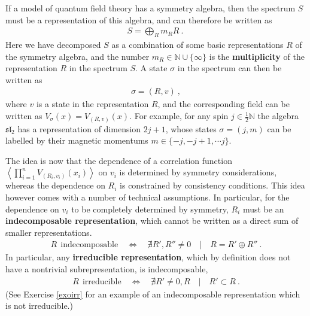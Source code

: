 \documentclass[12pt, a4paper, notitlepage, twoside]{report}
\numberwithin{equation}{section}
\theoremstyle{break}
\begin{document}
If a model of quantum field theory has a symmetry algebra, then the spectrum $S$ must be a representation of this algebra, and can therefore be written as
\begin{align}
 S = \bigoplus_R m_R  R\ .\
\label{somr}
\end{align}
Here we have decomposed $S$ as a combination of some basic representations $R$ of the symmetry algebra, and the number $m_R \in {\mathbb{N}}\cup\{\infty\}$ is the \textbf{\boldmath multiplicity} of the representation $R$ in the spectrum $S$.
A state $\sigma$ in the spectrum can then be written as 
\begin{align}
 \sigma = (R,v)\ ,
\label{arv}
\end{align}
where $v$ is a state in the representation $R$, and the corresponding field can be written as 
$V_\sigma(x)= V_{(R,v)}(x)$. For example, for any spin $j\in \frac12 \mathbb{N}$ the algebra $\mathfrak{sl}_2$ has a representation of dimension $2j+1$, whose states $\sigma = (j,m)$ can be labelled by their magnetic momentums $m\in\{-j, -j+1,\cdots j\}$.

The idea is now that the dependence of a correlation function $\left\langle \prod_{i=1}^n V_{(R_i,v_i)}(x_i)\right\rangle$ on $v_i$ is determined by symmetry considerations, whereas the dependence on $R_i$ is constrained by consistency conditions.
This idea however comes with a number of technical assumptions.
In particular, for the dependence on $v_i$ to be completely determined by symmetry, $R_i$ must be an \textbf{\boldmath indecomposable representation}, which cannot be written as a direct sum of smaller representations.
\begin{align}
 R \ \ \text{indecomposable} \quad \Leftrightarrow \quad \nexists R',R'' \neq 0 \quad | \quad R = R'\oplus R''\ .
\end{align}
In particular, any \textbf{\boldmath irreducible representation}, which by definition does not have a nontrivial subrepresentation, is indecomposable,
\begin{align}
 R \ \ \text{irreducible} \quad \Leftrightarrow \quad \nexists R' \neq 0,R \quad | \quad R'\subset R\ .
\end{align}
(See Exercise \ref{exoirr} for an example of an indecomposable representation which is not irreducible.)
\end{document}
